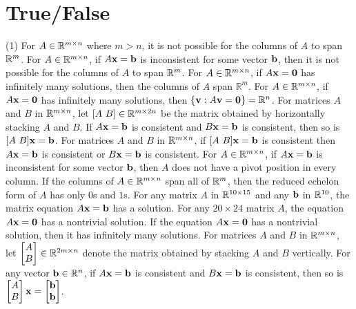 \section{True/False}

\trueFalseHeader

\begin{tasks}[resume, style=enumerate](1)
\task
  For $A \in \mathbb R^{m \times n}$ where $m > n$, it is not possible
  for the columns of $A$ to span $\mathbb R^m$.
\task
  For $A \in \mathbb R^{m \times n}$, if $A \mathbf x = \mathbf b$ is
  inconsistent for some vector $\mathbf b$, then it is not possible
  for the columns of $A$ to span $\mathbb R^m$.
\task
  For $A \in \mathbb R^{m \times n}$, if $A \mathbf x = \mathbf 0$ has
  infinitely many solutions, then the columns of $A$ span $\mathbb
  R^m$.
\task
  For $A \in \mathbb R^{m \times n}$, if $A \mathbf x = \mathbf 0$ has infinitely many
  solutions, then $\{ \mathbf v : A\mathbf v = \mathbf 0 \} = \mathbb R^n$.
\task
  For matrices $A$ and $B$ in $\mathbb R^{m \times n}$, let $[A \ B]
  \in \mathbb R ^ {m \times 2n}$ be the matrix obtained by
  horizontally stacking $A$ and $B$.  If $A\mathbf x = \mathbf b$ is
  consistent and $B\mathbf x = \mathbf b$ is consistent, then so is
  $[A \ B] \mathbf x = \mathbf b$.
\task
  For matrices $A$ and $B$ in $\mathbb R^{m \times n}$, if $[A
    \ B]\mathbf x = \mathbf b$ is consistent then $A\mathbf x =
  \mathbf b$ is consistent or $B \mathbf x = \mathbf b$ is consistent.
\task
  For $A \in \mathbb R^{m \times n}$, if $A \mathbf x = \mathbf b$ is
  inconsistent for some vector $\mathbf b$, then $A$ does not have a
  pivot position in every column.
\task
  If the columns of $A \in \mathbb R^{m \times n}$ span all of
  $\mathbb R^m$, then the reduced echelon form of $A$ has only $0$s
  and $1$s.
\task
  For any matrix $A$ in $\mathbb R^{10 \times 15}$ and any $\mathbf b$ in
  $\mathbb R^{10}$, the matrix equation $A\mathbf x = \mathbf b$ has a solution.
\task
  For any $20 \times 24$ matrix $A$, the equation $A\mathbf x = \mathbf 0$ has
  a nontrivial solution.
\task
  If the equation $A\mathbf x = \mathbf 0$ has a nontrivial
  solution, then it has infinitely many solutions.
\task
  For matrices $A$ and $B$ in $\mathbb R^{m \times n}$, let
  $\begin{bmatrix} A \\ B \end{bmatrix} \in \mathbb R^{2m \times n}$ denote
  the matrix obtained by stacking $A$ and $B$ vertically.  For any
  vector $\mathbf b \in \mathbb R^n$, if $A \mathbf x = \mathbf b$ is consistent and $B \mathbf x =
  \mathbf b$ is consistent, then so is $\begin{bmatrix} A \\ B \end{bmatrix}
  \mathbf x = \begin{bmatrix} \mathbf b \\ \mathbf b \end{bmatrix}$.
\end{tasks}

